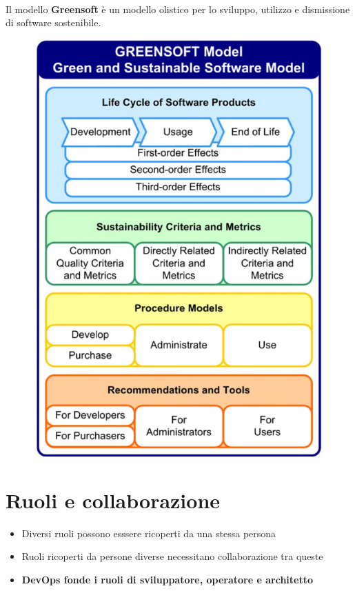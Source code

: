 \documentclass[a4paper, 12pt]{report}
\begin{document}
          \paragraph{}Il modello \textbf{Greensoft} è un modello olistico per lo sviluppo, utilizzo e dismissione di software sostenibile.
          \begin{figure}[htbp]
            \centering
            \includegraphics[scale=0.4]{Immagini/Greensoft.png}
          \end{figure}
          \section{Ruoli e collaborazione}
          \begin{itemize}
            \item Diversi ruoli possono esssere ricoperti da una stessa persona
            \item Ruoli ricoperti da persone diverse necessitano collaborazione tra queste
            \item \textbf{DevOps fonde i ruoli di sviluppatore, operatore e architetto}
          \end{itemize}
\end{document}
